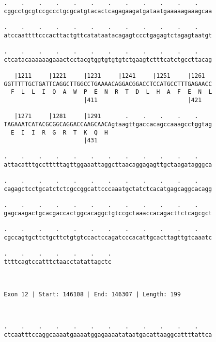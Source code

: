 \documentclass{article}
\begin{document}
\begin{Verbatim}
.    .    .    .    .    .    .    .    .    .    .    .    
cggcctgcgtccgccctgcgcatgtacactcagagaagatgataatgaaaaagaaagcaa
                                                            
.    .    .    .    .    .    .    .    .    .    .    .    
atccaattttcccacttactgttcatataatacagagtccctgagagtctagagtaatgt
                                                            
.    .    .    .    .    .    .    .    .    .    .    .    
ctcatacaaaaaagaaactcctacgtggtgtgtgtctgaagtctttcatctgccttacag
                                                            
   |1211     |1221     |1231     |1241     |1251     |1261  
GGTTTTTGCTGATTCAGGCTTGGCCTGAAAACAGGACGGACCTCCATGCCTTTGAGAACC
  F  L  L  I  Q  A  W  P  E  N  R  T  D  L  H  A  F  E  N  L
                       |411                          |421   
  
   |1271     |1281     |1291       .    .    .    .    .    
TAGAAATCATACGCGGCAGGACCAAGCAACAgtaagttgaccacagccaaagcctggtag
  E  I  I  R  G  R  T  K  Q  H                              
                       |431                                 
  
.    .    .    .    .    .    .    .    .    .    .    .    
attacatttgcctttttagttggaaattaggcttaacaggagagttgctaagatagggca
                                                            
.    .    .    .    .    .    .    .    .    .    .    .    
cagagctcctgcatctctcgccggcattcccaaatgctatctcacatgagcaggcacagg
                                                            
.    .    .    .    .    .    .    .    .    .    .    .    
gagcaagactgcacgaccactggcacaggctgtccgctaaaccacagacttctcagcgct
                                                            
.    .    .    .    .    .    .    .    .    .    .    .    
cgccagtgcttctgcttctgtgtccactccagatcccacattgcacttagttgtcaaatc
                                                            
.    .    .    .    .    .    .
ttttcagtccatttctaacctatattagctc
                               
                               
 
Exon 12 | Start: 146108 | End: 146307 | Length: 199



.    .    .    .    .    .    .    .    .    .    .    .    
ctcaatttccaggcaaaatgaaaatggagaaaatataatgacattaaggcattttattca
                                                            

\end{Verbatim}
\end{document}
